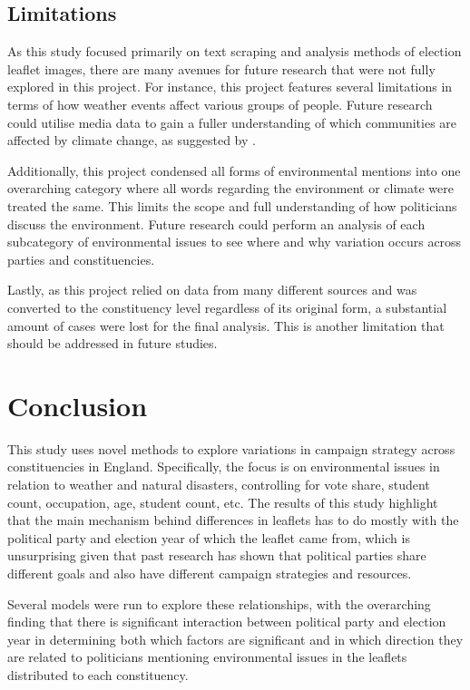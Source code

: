 \documentclass[12pt,letterpaper]{article}
\begin{document}
\subsection{Limitations}

As this study focused primarily on text scraping and analysis methods of election leaflet images, there are many avenues for future research that were not fully explored in this project. For instance, this project features several limitations in terms of how weather events affect various groups of people. Future research could utilise media data to gain a fuller understanding of which communities are affected by climate change, as suggested by \textcite{siscoEffectsWeatherExperiences2021}. 

Additionally, this project condensed all forms of environmental mentions into one overarching category where all words regarding the environment or climate were treated the same. This limits the scope and full understanding of how politicians discuss the environment. Future research could perform an analysis of each subcategory of environmental issues to see where and why variation occurs across parties and constituencies.

Lastly, as this project relied on data from many different sources and was converted to the constituency level regardless of its original form, a substantial amount of cases were lost for the final analysis. This is another limitation that should be addressed in future studies.
	

\section{Conclusion}

This study uses novel methods to explore variations in campaign strategy across constituencies in England. Specifically, the focus is on environmental issues in relation to weather and natural disasters, controlling for vote share, student count, occupation, age, student count, etc. The results of this study highlight that the main mechanism behind differences in leaflets has to do mostly with the political party and election year of which the leaflet came from, which is unsurprising given that past research \autocite{pogorelisIssueSalienceRegional2005} has shown that political parties share different goals and also have different campaign strategies and resources. 

Several models were run to explore these relationships, with the overarching finding that there is significant interaction between political party and election year in determining both which factors are significant and in which direction they are related to politicians mentioning environmental issues in the leaflets distributed to each constituency.
\end{document}
